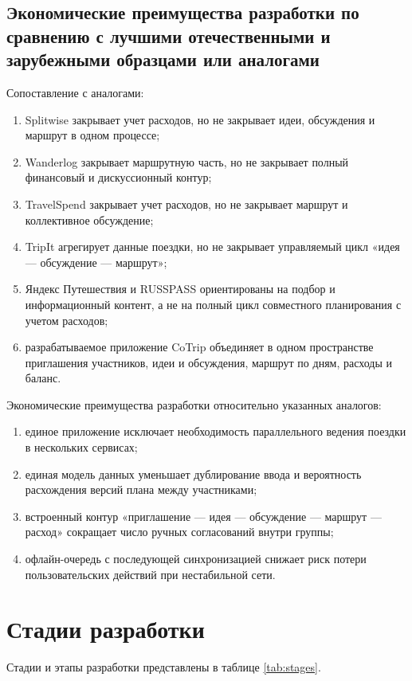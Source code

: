 \documentclass[12pt,a4paper]{article}
\begin{document}
\subsection{Экономические преимущества разработки по сравнению с лучшими отечественными и зарубежными образцами или аналогами}
Сопоставление с аналогами:
\begin{enumerate}
  \item Splitwise закрывает учет расходов, но не закрывает идеи, обсуждения и маршрут в одном процессе;
  \item Wanderlog закрывает маршрутную часть, но не закрывает полный финансовый и дискуссионный контур;
  \item TravelSpend закрывает учет расходов, но не закрывает маршрут и коллективное обсуждение;
  \item TripIt агрегирует данные поездки, но не закрывает управляемый цикл «идея --- обсуждение --- маршрут»;
  \item Яндекс Путешествия и RUSSPASS ориентированы на подбор и информационный контент, а не на полный цикл совместного планирования с учетом расходов;
  \item разрабатываемое приложение CoTrip объединяет в одном пространстве приглашения участников, идеи и обсуждения, маршрут по дням, расходы и баланс.
\end{enumerate}

Экономические преимущества разработки относительно указанных аналогов:
\begin{enumerate}
  \item единое приложение исключает необходимость параллельного ведения поездки в нескольких сервисах;
  \item единая модель данных уменьшает дублирование ввода и вероятность расхождения версий плана между участниками;
  \item встроенный контур «приглашение --- идея --- обсуждение --- маршрут --- расход» сокращает число ручных согласований внутри группы;
  \item офлайн-очередь с последующей синхронизацией снижает риск потери пользовательских действий при нестабильной сети.
\end{enumerate}

\clearpage
\section{Стадии разработки}
Стадии и этапы разработки представлены в таблице \ref{tab:stages}.
\end{document}
